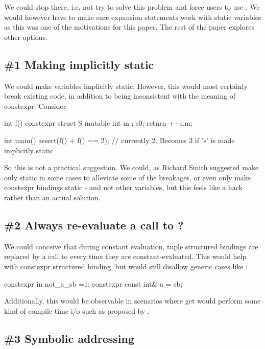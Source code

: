 \documentclass{wg21}
\begin{document}
We could stop there, i.e. not try to solve this problem and force users to use .
We would however have to make sure expansion statements work with static variables as this was one of the motivations for this paper.
The rest of the paper explores other options.

\subsection{\#1 Making  implicitly static}

We could make  variables implicitly static.
However, this would most certainly break existing code, in addition to being inconsistent with the meaning of constexpr.
Consider

\begin{colorblock}
int f() {
    constexpr struct S {
        mutable int m ;
    } s{0};
    return ++s.m;
}

int main() {
    assert(f() + f() == 2); // currently 2. Becomes 3 if 's' is made implicitly static
}
\end{colorblock}

So this is not a practical suggestion. We could, as Richard Smith suggested
make  only static in some cases to alleviate some of the breakages, or even only make constexpr bindings static - and not other variables, but this
feels like a hack rather than an actual solution.

\subsection{\#2 Always re-evaluate a call to ?}

We could conceive that during constant evaluation, tuple structured bindings are replaced by a call to  every time they are constant-evaluated.
This would help with constexpr structured binding, but would still disallow generic cases like :

\begin{colorblock}
constexpr in not_a_sb =1;
constexpr const int&  a = sb;
\end{colorblock}

Additionally, this would be observable in scenarios where get would perform some kind of compile-time i/o such as proposed by .

\subsection{\#3 Symbolic addressing}
\end{document}
